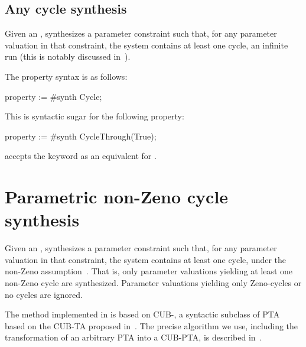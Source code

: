 
\subsection{Any cycle synthesis}\label{ss:loop}


Given an \NIPTA{}, \imitator{} synthesizes a parameter constraint such that, for any parameter valuation in that constraint, the system contains at least one cycle, \ie{} an infinite run (this is notably discussed in~\cite{ALime17}).

The property syntax is as follows:

\begin{IMITATORproperty}
property := #synth Cycle;
\end{IMITATORproperty}

This is syntactic sugar for the following property:

\begin{IMITATORproperty}
property := #synth CycleThrough(True);
\end{IMITATORproperty}

\begin{syntaxalias}
	\imitator{} accepts the  keyword as an equivalent for .
\end{syntaxalias}



\section{Parametric non-Zeno cycle synthesis}\label{ss:mode:Zeno}

Given an \NIPTA{}, \imitator{} synthesizes a parameter constraint such that, for any parameter valuation in that constraint, the system contains at least one cycle, under the non-Zeno assumption~\cite{ANPS17}.
That is, only parameter valuations yielding at least one non-Zeno cycle are synthesized.
Parameter valuations yielding only Zeno-cycles or no cycles are ignored.

The method implemented in \imitator{} is based on CUB-\IPTA{}, a syntactic subclass of PTA based on the CUB-TA proposed in~\cite{WSWLSDYL15}.
The precise algorithm we use, including the transformation of an arbitrary PTA into a CUB-PTA, is described in~\cite{ANPS17}.

